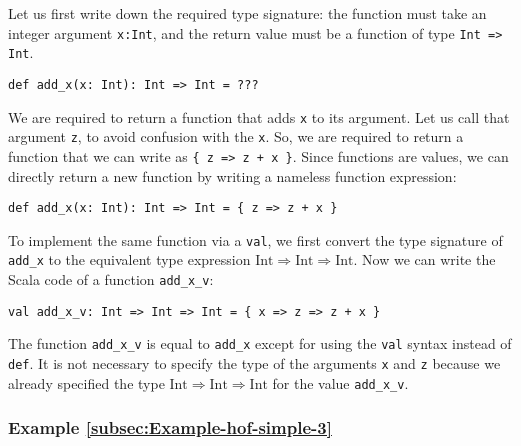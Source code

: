 Let us first write down the required type signature: the function
must take an integer argument \lstinline!x:Int!,
and the return value must be a function of type \lstinline!Int => Int!.
\begin{lstlisting}
def add_x(x: Int): Int => Int = ???
\end{lstlisting}
We are required to return a function that adds \lstinline!x!
to its argument. Let us call that argument \lstinline!z!,
to avoid confusion with the \lstinline!x!.
So, we are required to return a function that we can write as \lstinline!{ z => z + x }!.
Since functions are values, we can directly return a new function
by writing a nameless function expression:
\begin{lstlisting}
def add_x(x: Int): Int => Int = { z => z + x }
\end{lstlisting}
To implement the same function via a \lstinline!val!,
we first convert the type signature of \lstinline!add_x!
to the equivalent type expression $\text{Int}\Rightarrow\text{Int}\Rightarrow\text{Int}$.
Now we can write the Scala code of a function \lstinline!add_x_v!:
\begin{lstlisting}
val add_x_v: Int => Int => Int = { x => z => z + x }
\end{lstlisting}
The function \lstinline!add_x_v!
is equal to \lstinline!add_x!
except for using the \lstinline!val!
syntax instead of \lstinline!def!.
It is not necessary to specify the type of the arguments \lstinline!x!
and \lstinline!z! because
we already specified the type $\text{Int}\Rightarrow\text{Int}\Rightarrow\text{Int}$
for the value \lstinline!add_x_v!. 

\subsubsection{Example \label{subsec:Example-hof-simple-3}\ref{subsec:Example-hof-simple-3}}

